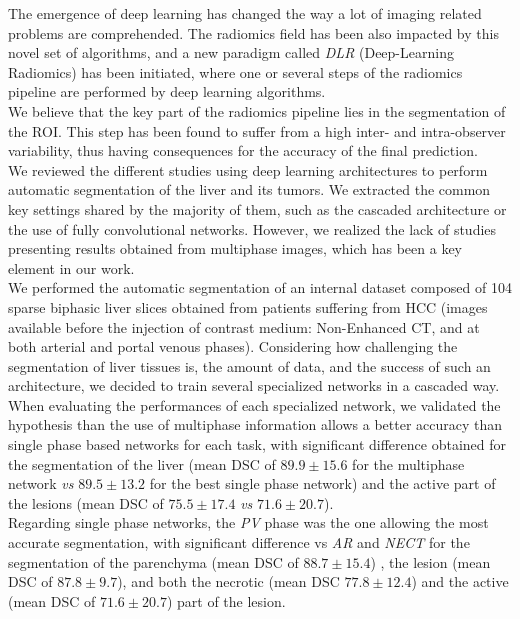 The emergence of deep learning has changed the way a lot of imaging
related problems are comprehended.
The radiomics field has been also impacted by this novel set of
algorithms, and a new paradigm called \emph{DLR} (Deep-Learning
Radiomics) has been initiated, where one or several steps of the
radiomics pipeline are performed by deep learning algorithms.\\
We believe that the key part of the radiomics pipeline lies in the
segmentation of the ROI. This step has been found to suffer from a high
inter- and intra-observer variability, thus having consequences for the
accuracy of the final prediction. \\
We reviewed the different studies using deep learning architectures to
perform automatic segmentation of the liver and its tumors. We extracted
the common key settings shared by the majority of them, such as the
cascaded architecture or the use of fully convolutional networks.
However, we realized the lack of studies presenting results obtained
from multiphase images, which has been a key element in our work. \\
We performed the automatic segmentation of an internal dataset composed
of 104 sparse biphasic liver slices obtained from patients suffering
from HCC (images available before the injection of contrast medium:
Non-Enhanced CT, and at both arterial and portal venous phases).
Considering how challenging the segmentation of liver tissues is, the
amount of data, and the success of such an architecture, we decided to
train several specialized networks in a cascaded way.\\
When evaluating the performances of each specialized network, we
validated the hypothesis than the use of multiphase information allows a
better accuracy than single phase based networks for each task,
with significant difference obtained for the segmentation of the liver
(mean DSC of $ 89.9 \pm 15.6 $ for the multiphase network \emph{vs} $ 89.5 \pm
13.2 $ for the best single phase network) and the active part of the
lesions (mean DSC of $ 75.5 \pm 17.4 $ \emph{vs} $ 71.6 \pm 20.7 $).\\
Regarding single phase networks, the \emph{PV} phase was the one
allowing the most accurate segmentation, with significant difference vs
\emph{AR} and \emph{NECT} for the segmentation of the parenchyma (mean
DSC of $ 88.7 \pm 15.4 $) , the lesion (mean DSC of $ 87.8 \pm 9.7 $), and both the
necrotic (mean DSC $ 77.8 \pm 12.4 $) and the active (mean DSC of $ 71.6 \pm 20.7 $)
part of the lesion. \\
